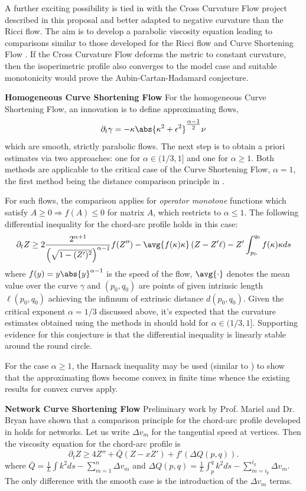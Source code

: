 \documentclass[12pt]{amsart}
\begin{document}
A further exciting possibility is tied in with the Cross Curvature Flow project described in this proposal and better adapted to negative curvature than the Ricci flow. The aim is to develop a parabolic viscosity equation leading to comparisons similar to those developed for the Ricci flow and Curve Shortening Flow \cite{MR2729306,MR2843240,pbthesis,Bryan}. If the Cross Curvature Flow deforms the metric to constant curvature, then the isoperimetric profile also converges to the model case and suitable monotonicity would prove the Aubin-Cartan-Hadamard conjecture.

\noindent\textbf{Homogeneous Curve Shortening Flow}
\label{sec:orgheadline7}
For the homogeneous Curve Shortening Flow, an innovation is to define approximating flows,
\[
\partial_t \gamma = -\kappa\abs{\kappa^2 + \epsilon^2}^{\tfrac{\alpha-1}{2}} \nu
\]
which are smooth, strictly parabolic flows. The next step is to obtain a priori estimates via two approaches: one for \(\alpha \in (1/3, 1]\) and one for \(\alpha \geq 1\). Both methods are applicable to the critical case of the Curve Shortening Flow, \(\alpha = 1\), the first method being the distance comparison principle in \cite{MR2794630}.

For such flows, the comparison applies for \emph{operator monotone} functions which satisfy \(A \geq 0 \Rightarrow f(A) \leq 0\) for matrix \(A\), which restricts to \(\alpha \leq 1\). The following differential inequality for the chord-arc profile holds in this case:
\[
\partial_t Z \geq 2 \frac{2^{\alpha+1}}{\left(\sqrt{1 - (Z')^2}\right)^{\alpha-1}} f(Z'') - \avg{f(\kappa) \kappa} \left(Z - Z'\ell\right) - Z' \int_{p_0}^{q_0} f(\kappa)\kappa ds
\]
where \(f(y) = y\abs{y}^{\alpha-1}\) is the speed of the flow, \(\avg{\cdot}\) denotes the mean value over the curve \(\gamma\) and \((p_0, q_0)\) are points of given intrinsic length \(\ell(p_0, q_0)\) achieving the infimum of extrinsic distance \(d(p_0, q_0)\). Given the critical exponent \(\alpha=1/3\) discussed above, it's expected that the curvature estimates obtained using the methods in \cite{MR2794630} should hold for \(\alpha \in (1/3, 1]\). Supporting evidence for this conjecture is that the differential inequality is linearly stable around the round circle.

For the case \(\alpha \geq 1\), the Harnack inequality may be used (similar to \cite{MR1094458}) to show that the approximating flows become convex in finite time whence the existing results for convex curves apply.

\noindent\textbf{Network Curve Shortening Flow}
\label{sec:orgheadline8}
Preliminary work by Prof. Mariel \saez{} and Dr. Bryan have shown that a comparison principle for the chord-arc profile developed in \cite{MR2794630} holds for networks. Let us write \(\Delta v_m\) for the tangential speed at vertices. Then the viscosity equation for the chord-arc profile is
\[
\partial_t Z \geq 4Z''+\bar{Q}(Z-xZ')+f'(\Delta Q(p,q)).
\]
where \(\bar{Q}=\frac{1}{L}\int k^2 ds-\sum_{m=1}^n \Delta v_m\) and \(\Delta Q(p,q)=\frac{1}{L}\int_p^q k^2 ds-\sum_{m=i_p}^{i_q} \Delta v_m\). The only difference with the smooth case is the introduction of the \(\Delta v_m\) terms.
\end{document}
